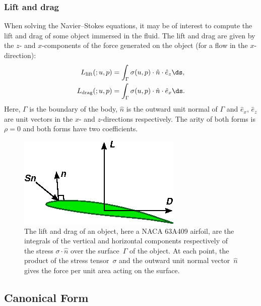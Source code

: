 \subsubsection{Lift and drag}

When solving the Navier--Stokes equations, it may be of interest to
compute the lift and drag of some object immersed in the fluid.  The
lift and drag are given by the $z$- and $x$-components of the force
generated on the object (for a flow in the $x$-direction):
\begin{displaymath}
  \begin{split}
    L_{\mathrm{lift}}(;u, p) &= \int_{\Gamma} \sigma(u, p) \cdot \hat{n} \cdot \hat{e}_z \ds, \\
    L_{\mathrm{drag}}(;u, p) &= \int_{\Gamma} \sigma(u, p) \cdot \hat{n} \cdot \hat{e}_x \ds.
  \end{split}
\end{displaymath}
Here, $\Gamma$ is the boundary of the body, $\hat{n}$ is the outward
unit normal of $\Gamma$ and $\hat{e}_x$, $\hat{e}_z$ are unit vectors
in the $x$- and $z$-directions respectively. The arity of both forms
is $\rho = 0$ and both forms have two coefficients.

\begin{figure}
  \begin{center}
    \includegraphics[width=\largewidth]{chapters/kirby-5/eps/lift_drag.eps}
    \caption{The lift and drag of an object, here a NACA 63A409
      airfoil, are the integrals of the vertical and horizontal
      components respectively of the stress $\sigma \cdot \hat{n}$ over the
      surface~$\Gamma$ of the object. At each point, the product of
      the stress tensor~$\sigma$ and the outward unit normal
      vector~$\hat{n}$ gives the force per unit area acting on the
      surface.}
  \end{center}
\end{figure}

\subsection{Canonical Form}

